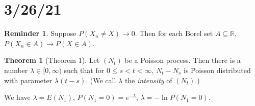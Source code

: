 \documentclass{article}
\newcommand{\R}{\mathbb{R}}
\theoremstyle{definition}
\newtheorem{theorem}{Theorem}
\newtheorem*{reminder}{Reminder}
\begin{document}
\section*{3/26/21}

\begin{reminder}
Suppose $P(X_n \neq X) \to 0$. Then for each Borel set $A \subseteq \R$, $P(X_n \in A) \to P(X \in A)$.
\end{reminder}

\begin{theorem}[Theorem 1]
Let $(N_t)$ be a Poisson process. Then there is a number $\lambda \in [0, \infty)$ such that for $0 \leq s < t < \infty$, $N_t - N_s$ is Poisson distributed with parameter $\lambda(t-s)$. (We call $\lambda$ the \emph{intensity} of $(N_t)$.)
\end{theorem}
We have $\lambda = E(N_1)$, $P(N_1 = 0) = e^{-\lambda}$, $\lambda = -\ln P(N_1 = 0)$.
\end{document}
